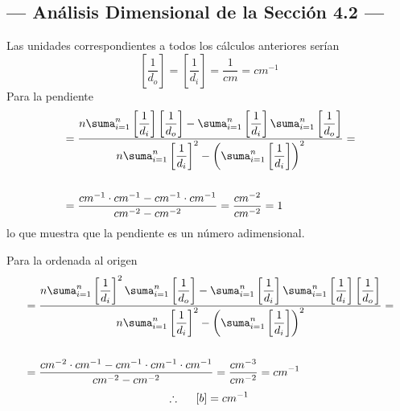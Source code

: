 \documentclass[10pt,a4paper]{article}
\begin{document}
	\subsection{--- Análisis Dimensional de la Sección 4.2 ---} %
	\label{sub:analisis_dim}
	Las unidades correspondientes a todos los cálculos anteriores serían $$\left[\dfrac{1}{d_o}\right]=\left[\dfrac{1}{d_i}\right]=\dfrac{1}{cm}=cm^{-1}$$
	Para la pendiente
	\begin{align*}
		[a]&=\dfrac{n\displaystyle\suma_{i=1}^{n}\left[\dfrac{1}{d_i}\right]\left[\dfrac{1}{d_o}\right]-\displaystyle\suma_{i=1}^{n}\left[\dfrac{1}{d_i}\right]\displaystyle\suma_{i=1}^{n}\left[\dfrac{1}{d_o}\right]}{n\displaystyle\suma_{i=1}^{n}\left[\dfrac{1}{d_i}\right]^2-\left(\displaystyle\suma_{i=1}^{n}\left[\dfrac{1}{d_i}\right]\right)^2}=\\\\
		&=\dfrac{cm^{-1}\cdot cm^{-1}-cm^{-1}\cdot cm^{-1}}{cm^{-2}-cm^{-2}}=\dfrac{cm^{-2}}{cm^{-2}}=1
	\end{align*}
	lo que muestra que la pendiente es un número adimensional. 
	
	Para la ordenada al origen
	\begin{align*}
		[b]&=\dfrac{n\displaystyle\suma_{i=1}^{n}\left[\dfrac{1}{d_i}\right]^2\displaystyle\suma_{i=1}^{n}\left[\dfrac{1}{d_o}\right]-\displaystyle\suma_{i=1}^{n}\left[\dfrac{1}{d_i}\right]\displaystyle\suma_{i=1}^{n}\left[\dfrac{1}{d_i}\right]\left[\dfrac{1}{d_o}\right]}{n\displaystyle\suma_{i=1}^{n}\left[\dfrac{1}{d_i}\right]^2-\left(\displaystyle\suma_{i=1}^{n}\left[\dfrac{1}{d_i}\right]\right)^2}=\\\\
		&=\dfrac{cm^{-2}\cdot cm^{-1}-cm^{-1}\cdot cm^{-1}\cdot cm^{-1}}{cm^{-2}-cm^{-2}}=\dfrac{cm^{-3}}{cm^{-2}}=cm^{-1}
	\end{align*}
	$$\therefore \hspace{5mm} [b]= cm^{-1}$$
\end{document}

